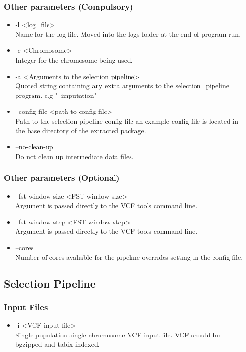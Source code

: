 \documentclass[a4paper,10pt]{article}
\begin{document}
\subsubsection{Other parameters (Compulsory)}
\begin{itemize}
\item -l <log\_file> \\
Name for the log file. Moved into the logs folder at the end of program run.
\item -c <Chromosome>\\
Integer for the chromosome being used.
\item -a <Arguments to the selection pipeline>\\
Quoted string containing any extra arguments to the selection\_pipeline program. e.g "--imputation"
\item --config-file <path to config file>\\
Path to the selection pipeline config file an example config file is located in the base directory of the extracted package.
\item --no-clean-up\\ 
Do not clean up intermediate data files.
\end{itemize}
\subsubsection{Other parameters (Optional)}
\begin{itemize}
\item --fst-window-size <FST window size>\\
Argument is passed directly to the VCF tools command line.
\item --fst-window-step <FST window step>\\
Argument is passed directly to the VCF tools command line.
\item --cores \\
Number of cores avaliable for the pipeline overrides setting in the config file.
\end{itemize}
\subsection{Selection Pipeline}
\subsubsection{Input Files}
\begin{itemize}
\item -i <VCF input file>\\
Single population single chromosome VCF input file. VCF should be bgzipped and tabix indexed.
\end{itemize}
\end{document}
